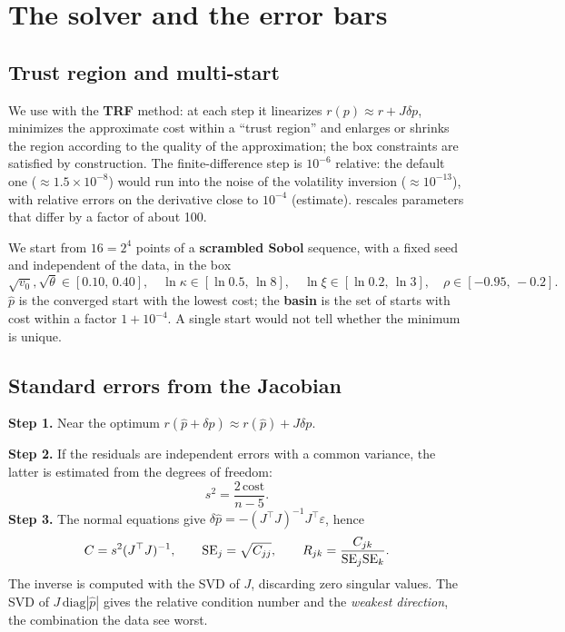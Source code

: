\section{The solver and the error bars}
\subsection{Trust region and multi-start}
We use  with the \textbf{TRF} method: at each step it linearizes
$r(p)\approx r+J\delta p$, minimizes the approximate cost within a ``trust region'' and enlarges or shrinks the region
according to the quality of the approximation; the box constraints are satisfied by construction. The finite-difference
step is $10^{-6}$ relative: the default one ($\approx1.5\times10^{-8}$) would run into the noise of the volatility
inversion ($\approx10^{-13}$), with relative errors on the derivative close to $10^{-4}$ (estimate).
 rescales parameters that differ by a factor of about 100.

We start from $16=2^4$ points of a \textbf{scrambled Sobol} sequence, with a fixed seed and independent of the data, in
the box
\[
\sqrt{v_0},\sqrt\theta\in[0.10,\,0.40],\quad \ln\kappa\in[\ln0.5,\,\ln8],\quad \ln\xi\in[\ln0.2,\,\ln3],\quad
\rho\in[-0.95,\,-0.2].
\]
$\hat p$ is the converged start with the lowest cost; the \textbf{basin} is the set of starts with cost within a
factor $1+10^{-4}$. A single start would not tell whether the minimum is unique.

\subsection{Standard errors from the Jacobian}
\noindent\textbf{Step 1.} Near the optimum $r(\hat p+\delta p)\approx r(\hat p)+J\delta p$.

\noindent\textbf{Step 2.} If the residuals are independent errors with a common variance, the latter is estimated from
the degrees of freedom:
\begin{equation}\label{eq:cal-s2}
s^2=\frac{2\,\text{cost}}{n-5}.
\end{equation}
\noindent\textbf{Step 3.} The normal equations give $\delta\hat p=-(J^\top J)^{-1}J^\top\varepsilon$, hence
\begin{equation}\label{eq:cal-cov}
C=s^2(J^\top J)^{-1},\qquad \mathrm{SE}_j=\sqrt{C_{jj}},\qquad R_{jk}=\frac{C_{jk}}{\mathrm{SE}_j\mathrm{SE}_k}.
\end{equation}
The inverse is computed with the SVD of $J$, discarding zero singular values. The SVD of $J\,\mathrm{diag}|\hat p|$
gives the relative condition number and the \emph{weakest direction}, the combination the data see worst.

